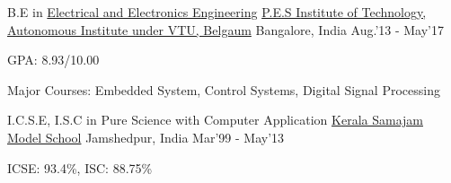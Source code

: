 \begin{cventries}
	\cventry
	{B.E in \href{https://eee.pes.edu/}{Electrical and Electronics Engineering}}
	{\href{https://pesit.pes.edu/}{P.E.S Institute of Technology, Autonomous Institute under VTU, Belgaum}}
	{Bangalore, India}
	{Aug.'13 - May'17}
	{
		\begin{cvitems}
		\item{GPA: 8.93/10.00}
		\item{Major Courses: Embedded System, Control Systems, Digital Signal Processing}
		\end{cvitems}
	}
\end{cventries}
\begin{cventries}
	\cventry
	{I.C.S.E, I.S.C in {Pure Science with Computer Application}}
	{\href{https://ksms.ac.in/}{Kerala Samajam Model School}}
	{Jamshedpur, India}
	{Mar'99 - May'13}
	{
		\begin{cvitems}
		\item{ICSE: 93.4\%, ISC: 88.75\%}
		\end{cvitems}
	}
\end{cventries}
